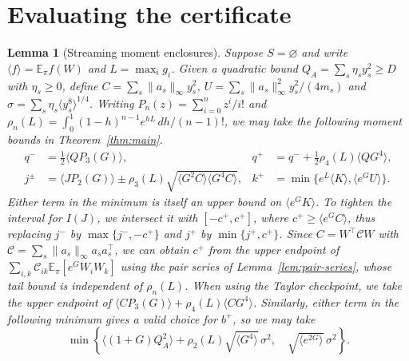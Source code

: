 \documentclass{article}
\numberwithin{equation}{section}
\newtheorem{lemma}[theorem]{Lemma}
\theoremstyle{remark}
\newcommand{\E}{\mathbb E}
\begin{document}
\begingroup
\small
\setlength{\bibsep}{1pt plus 0.4pt}

\endgroup

\appendix
\section{Evaluating the certificate}\label{sec:certificate-evaluation}

\begin{lemma}[Streaming moment enclosures]\label{lem:streaming-moments}
Suppose $S=\varnothing$ and write $\langle f\rangle=\E_\pi f(W)$ and
$L=\max_i g_i$. Given a quadratic bound $Q_A=\sum_s\eta_s y_s^2\ge D$
with $\eta_s\ge0$, define $C=\sum_s\|a_s\|_\infty y_s^2$,
$U=\sum_s\|a_s\|_\infty^2 y_s^2/(4m_s)$ and
$\sigma=\sum_s\eta_s\langle y_s^8\rangle^{1/4}$. Writing
$P_n(z)=\sum_{i=0}^n z^i/i!$ and
$\rho_n(L)=\int_0^1 (1-h)^{n-1}e^{hL}\,dh/(n-1)!$, we may take
the following moment bounds in Theorem~\ref{thm:main}.
\begin{align*}
 q^-&=\tfrac12\langle QP_3(G)\rangle,&
 q^+&=q^-+\tfrac12\rho_4(L)\langle QG^4\rangle,\\
 j^\pm&=\langle JP_2(G)\rangle\pm
 \rho_3(L)\sqrt{\langle G^2 C\rangle\langle G^4 C\rangle},&
 k^+&=\min\{e^L\langle K\rangle,\langle e^G U\rangle\}.
\end{align*}
Either term in the minimum is itself an upper bound on
$\langle e^G K\rangle$. To tighten the interval for $I(J)$, we intersect
it with $[-c^+,c^+]$, where $c^+\ge\langle e^G C\rangle$, thus replacing
$j^-$ by $\max\{j^-,-c^+\}$ and $j^+$ by $\min\{j^+,c^+\}$.
Since $C=W^\top\mathcal C W$ with
$\mathcal C=\sum_s\|a_s\|_\infty a_sa_s^\top$, we can obtain $c^+$
from the upper endpoint of $\sum_{i,k}\mathcal C_{ik}\E_\pi[e^GW_iW_k]$
using the pair series of Lemma~\ref{lem:pair-series}, whose tail bound
is independent of $\rho_n(L)$. When using the Taylor checkpoint, we
take the upper endpoint of
$\langle C P_3(G)\rangle+\rho_4(L)\langle C G^4\rangle$.
Similarly, either term in the following minimum gives a valid choice
for $b^+$, so we may take
\begin{equation}
 \min\left\{\langle(1+G)Q_A^2\rangle+
       \rho_2(L)\sqrt{\langle G^4\rangle}\,\sigma^2,\quad
       \sqrt{\langle e^{2G}\rangle}\,\sigma^2\right\}.
 \label{eq:certificate-square}
\end{equation}
\end{lemma}
\end{document}
